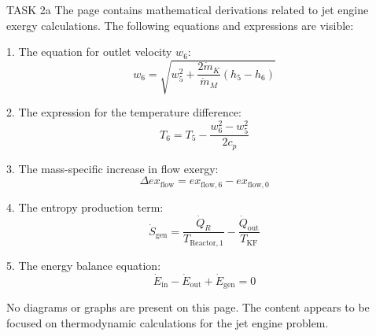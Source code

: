 TASK 2a  
The page contains mathematical derivations related to jet engine exergy calculations. The following equations and expressions are visible:

1. The equation for outlet velocity \( w_6 \):
\[
w_6 = \sqrt{w_5^2 + \frac{2 \dot{m}_K}{\dot{m}_M} \left( h_5 - h_6 \right)}
\]

2. The expression for the temperature difference:
\[
T_6 = T_5 - \frac{w_6^2 - w_5^2}{2 c_p}
\]

3. The mass-specific increase in flow exergy:
\[
\Delta ex_{\text{flow}} = ex_{\text{flow},6} - ex_{\text{flow},0}
\]

4. The entropy production term:
\[
\dot{S}_{\text{gen}} = \frac{\dot{Q}_R}{T_{\text{Reactor},1}} - \frac{\dot{Q}_{\text{out}}}{T_{\text{KF}}}
\]

5. The energy balance equation:
\[
\dot{E}_{\text{in}} - \dot{E}_{\text{out}} + \dot{E}_{\text{gen}} = 0
\]

No diagrams or graphs are present on this page. The content appears to be focused on thermodynamic calculations for the jet engine problem.